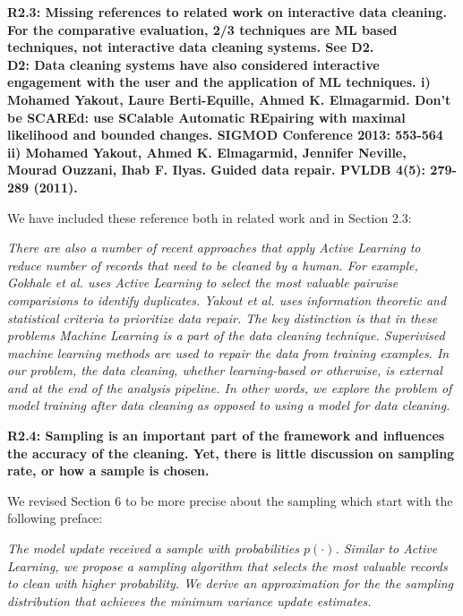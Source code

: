 \vspace{0.5em}

\noindent\textbf{R2.3: Missing references to related work on interactive data cleaning. For the comparative evaluation, 2/3 techniques are ML based techniques, not interactive data cleaning systems. See D2.\\
D2: Data cleaning systems have also considered interactive engagement with the user and the application of ML techniques. 
i) Mohamed Yakout, Laure Berti-Equille, Ahmed K. Elmagarmid. Don't be SCAREd: use SCalable Automatic REpairing with maximal likelihood and bounded changes. SIGMOD Conference 2013: 553-564
ii) Mohamed Yakout, Ahmed K. Elmagarmid, Jennifer Neville, Mourad Ouzzani, Ihab F. Ilyas.
Guided data repair. PVLDB 4(5): 279-289 (2011).
}

We have included these reference both in related work and in Section 2.3:

\emph{There are also a number of recent approaches that apply Active Learning to reduce number of records that need to be cleaned by a human.
For example, Gokhale et al. \cite{gokhale2014corleone} uses Active Learning to select the most valuable pairwise comparisions to identify duplicates.
Yakout et al. \cite{yakout2013don,DBLP:journals/pvldb/YakoutENOI11} uses information theoretic and statistical criteria to prioritize data repair.
The key distinction is that in these problems Machine Learning is a part of the data cleaning technique.
Superivised machine learning methods are used to repair the data from training examples.
In our problem, the data cleaning, whether learning-based or otherwise, is external and at the end of the analysis pipeline.
In other words, we explore the problem of model training \emph{after} data cleaning as opposed to using a model \emph{for} data cleaning.
}

\vspace{0.5em}

\textbf{R2.4: Sampling is an important part of the framework and influences the accuracy of the cleaning. Yet, there is little discussion on sampling rate, or how a sample is chosen.}

We revised Section 6 to be more precise about the sampling which start with the following preface:

\emph{The model update received a sample with probabilities $p(\cdot)$.
Similar to Active Learning, we propose a sampling algorithm that selects the most valuable records to clean with higher probability.
We derive an approximation for the the sampling distribution that achieves the minimum variance update estimates. }

